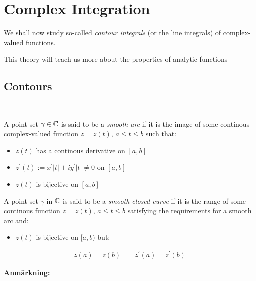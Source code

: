 \section{Complex Integration}\par
\noindent We shall now study so-called \textit{contour integrals} (or the line integrals) of complex-valued functions.
\par\bigskip
\noindent This theory will teach us more about the properties of analytic functions
\par\bigskip
\subsection{Contours}\hfill\\
\par\bigskip
\begin{theo}{}
  A point set $\gamma\in\mathbb{C}$ is said to be a \textit{smooth arc}  if it is the image of some continous complex-valued function $z = z(t)$, $a\leq t\leq b$ such that:\par
  \begin{itemize}
    \item $z(t)$ has a continous derivative on $[a,b]$
    \item $z^{\prime}(t):= x^{\prime}\left|t\right|+iy^{\prime}\left|t\right|\neq0$ on $[a,b]$
    \item $z(t)$ is bijective on $[a,b]$
  \end{itemize}
\end{theo}
\par\bigskip
\begin{theo}{}
  A point set $\gamma$ in $\mathbb{C}$ is said to be a \textit{smooth closed curve} if it is the range of some continous function $z = z(t)$, $a\leq t\leq b$ satisfying the requirements for a smooth arc and:\par
  \begin{itemize}
    \item $z(t)$ is bijective on $[a,b)$ but:
  \end{itemize}
  \begin{equation*}
    \begin{gathered}
      z(a) = z(b)\qquad z^{\prime}(a) = z^{\prime}(b)
    \end{gathered}
  \end{equation*}
\end{theo}
\par\bigskip
\noindent\textbf{Anmärkning:}\par
